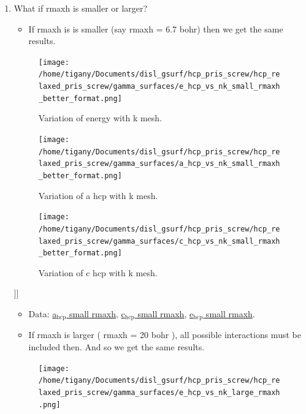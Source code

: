 \documentclass[11pt]{article}
\begin{document}
\begin{enumerate}
\begin{enumerate}
\item What if rmaxh is smaller or larger?
\label{sec:orgc40f228}
\begin{itemize}
\item If rmaxh is is smaller (say rmaxh = 6.7 bohr) then we get the same
results.
\end{itemize}
\begin{figure}[htbp]
\centering
\texttt{[image: /home/tigany/Documents/disl\_gsurf/hcp\_pris\_screw/hcp\_relaxed\_pris\_screw/gamma\_surfaces/e\_hcp\_vs\_nk\_small\_rmaxh\_better\_format.png]}
\caption{\label{fig:org2648912}
Variation of energy with k mesh.}
\end{figure}
\begin{figure}[htbp]
\centering
\texttt{[image: /home/tigany/Documents/disl\_gsurf/hcp\_pris\_screw/hcp\_relaxed\_pris\_screw/gamma\_surfaces/a\_hcp\_vs\_nk\_small\_rmaxh\_better\_format.png]}
\caption{\label{fig:orgd1b5653}
Variation of a hcp with k mesh.}
\end{figure}
\begin{figure}[htbp]
\centering
\texttt{[image: /home/tigany/Documents/disl\_gsurf/hcp\_pris\_screw/hcp\_relaxed\_pris\_screw/gamma\_surfaces/c\_hcp\_vs\_nk\_small\_rmaxh\_better\_format.png]}
\caption{\label{fig:org4bd15e5}
Variation of c hcp with k mesh.}
\end{figure}]]
\begin{itemize}
\item Data: \href{file:///home/tigany/Documents/disl\_gsurf/hcp\_pris\_screw/hcp\_relaxed\_pris\_screw/gamma\_surfaces/a\_hcp\_vs\_nk\_rmaxh\_small.pkl}{a\(_{\text{hcp}}\) small rmaxh}, \href{file:///home/tigany/Documents/disl\_gsurf/hcp\_pris\_screw/hcp\_relaxed\_pris\_screw/gamma\_surfaces/c\_hcp\_vs\_nk\_rmaxh\_small.pkl}{c\(_{\text{hcp}}\) small rmaxh}, \href{file:///home/tigany/Documents/disl\_gsurf/hcp\_pris\_screw/hcp\_relaxed\_pris\_screw/gamma\_surfaces/e\_hcp\_vs\_nk\_rmaxh\_small.pkl}{e\(_{\text{hcp}}\) small rmaxh}.
\end{itemize}
\begin{itemize}
\item If rmaxh is larger ( rmaxh = 20 bohr ), all possible interactions must
be included then. And so we get the same results.
\end{itemize}
\begin{figure}[htbp]
\centering
\texttt{[image: /home/tigany/Documents/disl\_gsurf/hcp\_pris\_screw/hcp\_relaxed\_pris\_screw/gamma\_surfaces/e\_hcp\_vs\_nk\_large\_rmaxh.png]}

\end{figure}
\end{enumerate}
\end{enumerate}
\end{document}
